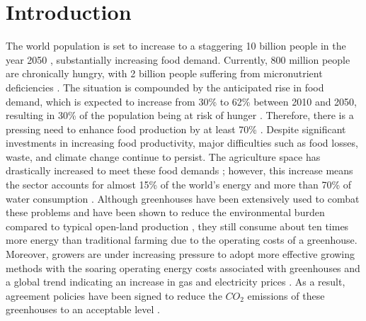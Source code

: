 \chapter{Introduction}
\label{chapter:introduction, written in the present tense}
The world population is set to increase to a staggering 10 billion people in the year 2050 \cite{blazhevskaGrowingSlowerPace2019}, substantially increasing food demand. Currently, 800 million people are chronically hungry, with 2 billion people suffering from micronutrient deficiencies \cite{faoFutureFoodAgriculture2017}. The situation is compounded by the anticipated rise in food demand, which is expected to increase from 30\% to 62\% between 2010 and 2050, resulting in 30\% of the population being at risk of hunger \cite{vandijkMetaanalysisProjectedGlobal2021}. Therefore, there is a pressing need to enhance food production by at least 70\% \cite{nishatGreenDealGreenhouse2020}. Despite significant investments in increasing food productivity, major difficulties such as food losses, waste, and climate change continue to persist\cite{faoFutureFoodAgriculture2017}. The agriculture space has drastically increased to meet these food demands \cite{winklerGlobalLandUse2021}; however, this increase means the sector accounts for almost 15\% of the world’s energy and more than 70\% of water consumption \cite{nishatGreenDealGreenhouse2020}. Although greenhouses have been extensively used to combat these problems and have been shown to reduce the environmental burden compared to typical open-land production \cite{munozComparingEnvironmentalImpacts2008}, they still consume about ten times more energy than traditional farming \cite{nishatGreenDealGreenhouse2020} due to the operating costs of a greenhouse. Moreover, growers are under increasing pressure to adopt more effective growing methods with the soaring operating energy costs associated with greenhouses and a global trend indicating an increase in gas and electricity prices \cite{alvarezWhatSoaringEnergy2021}. As a result, agreement policies have been signed to reduce the $CO_2$ emissions of these greenhouses to an acceptable level \cite{breukersPowerDutchGreenhouse}. \\

